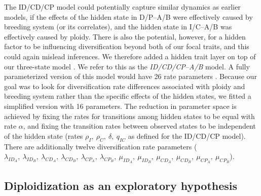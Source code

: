 The ID/CD/CP model could potentially capture similar dynamics as earlier models, if the effects of the hidden state in D/P--A/B were effectively caused by breeding system (or its correlates), and the hidden state in I/C--A/B was effectively caused by ploidy. %
There is also the potential, however, for a hidden factor to be influencing diversification beyond both of our focal traits, and this could again mislead inferences.
We therefore added a hidden trait layer on top of our three-state model \citep[analogous to][]{caetano_2018, herrera_2018, huang_2018}.
We refer to this as the \textit{ID/CD/CP--A/B} model.
A fully parameterized version of this model would have 26 rate parameters \citep{herrera_2018}. 
Because our goal was to look for diversification rate differences associated with ploidy and breeding system rather than the specific effects of the hidden states, we fitted a simplified version with 16 parameters.
The reduction in parameter space is achieved by fixing the rates for transitions among hidden states to be equal with rate $\alpha$, and fixing the transition rates between observed states to be independent of the hidden state (rates $\rho_I,\ \rho_C,\ \delta,\ q_{IC}$ as defined for the ID/CD/CP model).
There are additionally twelve diversification rate parameters ($\lambda_{ID_A},\ \lambda_{ID_B},\ \lambda_{CD_A},\ \lambda_{CD_B},\ \lambda_{CP_A},\ \lambda_{CP_B},\ \mu_{ID_A},\ \mu_{ID_B},\ \mu_{CD_A},\ \mu_{CD_B},\ \mu_{CP_A},\ \mu_{CP_B}$).


\subsection{Diploidization as an exploratory hypothesis}

